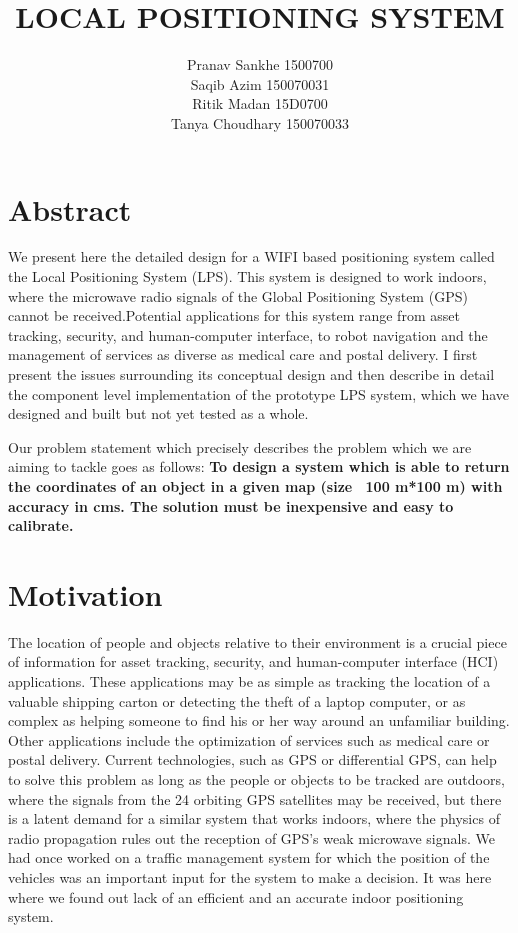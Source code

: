 \documentclass[12pt]{article}
\title{LOCAL POSITIONING SYSTEM}
\author{
Pranav Sankhe 1500700
\\ Saqib Azim 150070031
\\ Ritik Madan 15D0700
\\ Tanya Choudhary 150070033
}
\begin{document}
\maketitle

\section{Abstract}
We present here the detailed design for a WIFI based positioning system called the Local Positioning System (LPS). This system is designed to work indoors, where the microwave radio signals of the Global Positioning System (GPS) cannot be received.Potential applications for this system range from asset tracking, security, and human-computer interface, to robot navigation and the management of services as diverse as medical care and postal delivery. I first present the issues surrounding its conceptual design and then describe in detail the component level implementation of the prototype LPS system, which we have designed and built but not yet tested as a whole.

Our problem statement which precisely describes the problem which we are aiming to tackle goes as follows: 
\textbf{To design a system which is able to return the coordinates of an object in a given map (size ~100 m*100 m) with accuracy in cms. The solution must be inexpensive and easy to calibrate.}

\section{Motivation}

The location of people and objects relative to their environment is a crucial piece of information for asset tracking, security, and human-computer interface (HCI) applications. These applications may be as simple as tracking the location of a valuable shipping carton or detecting the theft of a laptop computer, or as complex as helping someone to find his or her way around an unfamiliar building. Other applications include the optimization of services such as medical care or postal delivery. Current technologies, such as GPS or differential GPS, can help to solve this problem as long as the people or objects to be tracked are outdoors, where the signals from the 24 orbiting GPS satellites may be received, but there is a latent demand for a similar system that works indoors, where the physics of radio propagation rules out the reception of GPS’s weak microwave signals.
We had once worked on a traffic management system for which the position of the vehicles was an important input for the system to make a decision. It was here where we found out lack of an efficient and an accurate indoor positioning system. 
\end{document}
